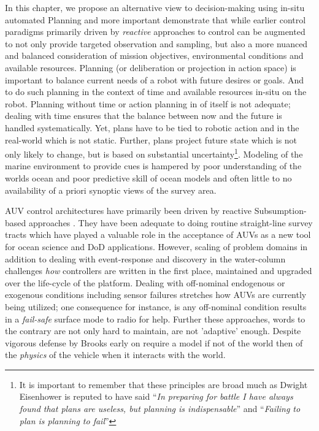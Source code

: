 In this chapter, we propose an alternative view to decision-making
using in-situ automated Planning \cite{ghallab04} and more important
demonstrate that while earlier control paradigms primarily driven by
\emph{reactive} approaches to control can be augmented to not only
provide targeted observation and sampling, but also a more nuanced and
balanced consideration of mission objectives, environmental conditions
and available resources. Planning (or deliberation or projection in
action space) is important to balance current needs of a robot with
future desires or goals. And to do such planning in the context of
time and available resources in-situ on the robot. Planning without
time or action planning in of itself is not adequate; dealing with
time ensures that the balance between now and the future is handled
systematically. Yet, plans have to be tied to robotic action and in
the real-world which is not static. Further, plans project future
state which is not only likely to change, but is based on substantial
uncertainty\footnote{It is important to remember that these principles
  are broad much as Dwight Eisenhower is reputed to have said
  ``\emph{In preparing for battle I have always found that plans are
    useless, but planning is indispensable}'' and ``\emph{Failing to
    plan is planning to fail}''}. Modeling of the marine environment
to provide cues is hampered by poor understanding of the worlds ocean
and poor predictive skill of ocean models and often little to no
availability of a priori synoptic views of the survey area. 

AUV control architectures have primarily been driven by reactive
Subsumption-based approaches \cite{brooks86}. They have been adequate
to doing routine straight-line survey tracts which have played a
valuable role in the acceptance of AUVs as a new tool for ocean
science and DoD applications. However, scaling of problem domains in
addition to dealing with event-response and discovery in the
water-column challenges \emph{how} controllers are written in the
first place, maintained and upgraded over the life-cycle of the
platform. Dealing with off-nominal endogenous or exogenous conditions
including sensor failures stretches how AUVs are currently being
utilized; one consequence for instance, is any off-nominal condition
results in a \emph{fail-safe} surface mode to radio for help. Further
these approaches, words to the contrary are not only hard to maintain,
are not 'adaptive' enough. Despite vigorous defense by Brooks early on
\cite{Brooks91intelligencewithoutrea,Brooks91intelligencewithoutrep}
require a model if not of the world then of the \emph{physics} of the
vehicle when it interacts with the world.

